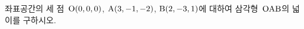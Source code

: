 좌표공간의 세 점~$\mathrm{O}(0{,}\mkern3mu\mathopen{}0{,}\mkern3mu\mathopen{}0)$, $\mathrm{A}(3{,}\mkern3mu\mathopen{}-1{,}\mkern3mu\mathopen{}-2)$, $\mathrm{B}(2{,}\mkern3mu\mathopen{}-3{,}\mkern3mu\mathopen{}1)$에 대하여 삼각형~$\mathrm{OAB}$의 넓이를 구하시오.
